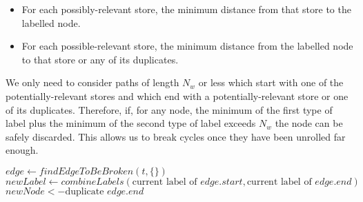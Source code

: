 \begin{itemize}
\item
  For each possibly-relevant store, the minimum distance from that store to the labelled node.
\item
  For each possible-relevant store, the minimum distance from the labelled node to that store or any of its duplicates.
\end{itemize}

We only need to consider paths of length $N_w$ or less which start with one of the potentially-relevant stores and which end with a potentially-relevant store or one of its duplicates.
Therefore, if, for any node, the minimum of the first type of label plus the minimum of the second type of label exceeds $N_w$ the node can be safely discarded.
This allows us to break cycles once they have been unrolled far enough.

\begin{algorithmic}
       \STATE $edge \gets findEdgeToBeBroken(t, \{\})$
       \STATE $newLabel \gets combineLabels(\text{current label of } edge.start, \text{current label of } edge.end)$
       \ELSE
           \STATE $newNode <- \text{duplicate } edge.end$
           \ENDFOR
       \ENDIF
    \ENDWHILE
  \ENDFOR
\end{algorithmic}


